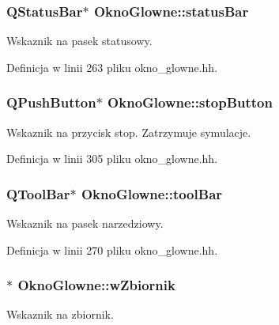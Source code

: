 \subsubsection[{status\+Bar}]{\setlength{\rightskip}{0pt plus 5cm}Q\+Status\+Bar$\ast$ Okno\+Glowne\+::status\+Bar\hspace{0.3cm}{\ttfamily [private]}}\label{class_okno_glowne_a40a10989bc6b318ac24e2457d7adb53b}
Wskaznik na pasek statusowy. 

Definicja w linii 263 pliku okno\+\_\+glowne.\+hh.

\hypertarget{class_okno_glowne_a3051d73dc0e0a27dc30ada43cc6b63c4}{}
\subsubsection[{stop\+Button}]{\setlength{\rightskip}{0pt plus 5cm}Q\+Push\+Button$\ast$ Okno\+Glowne\+::stop\+Button\hspace{0.3cm}{\ttfamily [private]}}\label{class_okno_glowne_a3051d73dc0e0a27dc30ada43cc6b63c4}
Wskaznik na przycisk stop. Zatrzymuje symulacje. 

Definicja w linii 305 pliku okno\+\_\+glowne.\+hh.

\hypertarget{class_okno_glowne_a6a37dd1f32605092fff7feac712bf429}{}
\subsubsection[{tool\+Bar}]{\setlength{\rightskip}{0pt plus 5cm}Q\+Tool\+Bar$\ast$ Okno\+Glowne\+::tool\+Bar\hspace{0.3cm}{\ttfamily [private]}}\label{class_okno_glowne_a6a37dd1f32605092fff7feac712bf429}
Wskaznik na pasek narzedziowy. 

Definicja w linii 270 pliku okno\+\_\+glowne.\+hh.

\hypertarget{class_okno_glowne_af2d1275209898ebdd5ab9de8ef78dffd}{}
\subsubsection[{w\+Zbiornik}]{$\ast$ Okno\+Glowne\+::w\+Zbiornik\hspace{0.3cm}{\ttfamily [private]}}\label{class_okno_glowne_af2d1275209898ebdd5ab9de8ef78dffd}
Wskaznik na zbiornik. 

